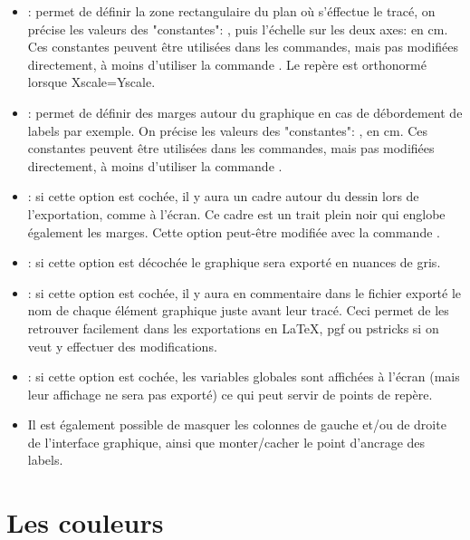 \begin{itemize}
\item {}: permet de définir la zone rectangulaire du plan où s'éffectue le tracé, 
on précise les valeurs des "constantes": , puis l'échelle sur les deux axes:  en cm. Ces constantes peuvent être utilisées dans les commandes, mais pas modifiées directement, à moins
d'utiliser la commande . Le repère est orthonormé lorsque Xscale=Yscale.


\item {}: permet de définir des marges autour du graphique en cas de débordement de labels par exemple.
On précise les valeurs des "constantes": , en cm.
Ces constantes peuvent être utilisées dans les commandes, mais pas modifiées directement, à moins d'utiliser la commande
.

\item {}: si cette option est cochée, il y aura un cadre autour du dessin lors de
l'exportation, comme à l'écran. Ce cadre est un trait plein noir qui englobe également les marges. Cette option
peut-être modifiée avec la commande .

\item {}: si cette option est décochée le graphique sera exporté en nuances de gris.

\item {}: si cette option est cochée, il y aura en commentaire dans le fichier exporté le nom de
chaque élément graphique juste avant leur tracé. Ceci permet de les retrouver facilement dans les exportations en LaTeX,
pgf ou pstricks si on veut y effectuer des modifications.

\item {}: si cette option est cochée, les variables globales sont affichées à
l'écran (mais leur affichage ne sera pas exporté) ce qui peut servir de points de repère.

\item Il est également possible de masquer les colonnes de gauche et/ou de droite de l'interface graphique, ainsi que
monter/cacher le point d'ancrage des labels.
\end{itemize}

\section{Les couleurs}\label{chapcouleurs}


